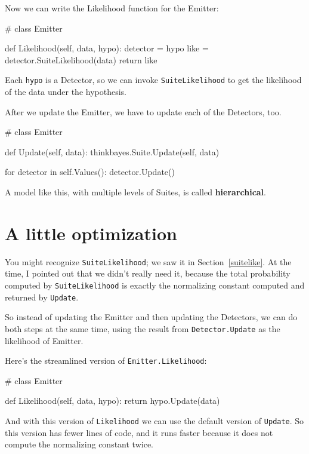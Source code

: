 \documentclass[12pt]{book}
\theoremstyle{exercise}
\begin{document}
Now we can write the Likelihood function for the Emitter:

\begin{code}
# class Emitter

    def Likelihood(self, data, hypo):
        detector = hypo
        like = detector.SuiteLikelihood(data)
        return like
\end{code}

Each {\tt hypo} is a Detector, so we can invoke
{\tt SuiteLikelihood} to get the likelihood of the data under
the hypothesis.

After we update the Emitter, we have to update each of the
Detectors, too.  

\begin{code}
# class Emitter

    def Update(self, data):
        thinkbayes.Suite.Update(self, data)
        
        for detector in self.Values():
            detector.Update()
\end{code}

A model like this, with multiple levels of Suites, is called {\bf
  hierarchical}.  


\section{A little optimization}

You might recognize {\tt SuiteLikelihood}; we saw it
in Section~\ref{suitelike}.  At the time, I pointed out that
we didn't really need it, because the total probability
computed by {\tt SuiteLikelihood} is exactly the normalizing
constant computed and returned by {\tt Update}.
 
So instead of updating the Emitter and then updating the
Detectors, we can do both steps at the same time, using
the result from {\tt Detector.Update} as the likelihood
of Emitter.

Here's the streamlined version of {\tt Emitter.Likelihood}:

\begin{code}
# class Emitter

    def Likelihood(self, data, hypo):
        return hypo.Update(data)
\end{code}

And with this version of {\tt Likelihood} we can use the
default version of {\tt Update}.  So this version has fewer
lines of code, and it runs faster because it does not compute
the normalizing constant twice.
\end{document}
